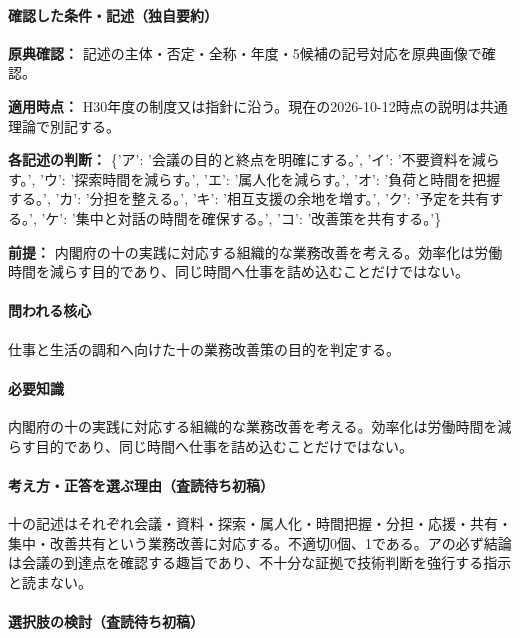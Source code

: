 \paragraph{確認した条件・記述（独自要約）}\mbox{}\par

\noindent\textbf{原典確認：} 記述の主体・否定・全称・年度・5候補の記号対応を原典画像で確認。\par

\noindent\textbf{適用時点：} H30年度の制度又は指針に沿う。現在の2026-10-12時点の説明は共通理論で別記する。\par

\noindent\textbf{各記述の判断：} \{'ア': '会議の目的と終点を明確にする。', 'イ': '不要資料を減らす。', 'ウ': '探索時間を減らす。', 'エ': '属人化を減らす。', 'オ': '負荷と時間を把握する。', 'カ': '分担を整える。', 'キ': '相互支援の余地を増す。', 'ク': '予定を共有する。', 'ケ': '集中と対話の時間を確保する。', 'コ': '改善策を共有する。'\}\par

\noindent\textbf{前提：} 内閣府の十の実践に対応する組織的な業務改善を考える。効率化は労働時間を減らす目的であり、同じ時間へ仕事を詰め込むことだけではない。\par

\paragraph{問われる核心} 仕事と生活の調和へ向けた十の業務改善策の目的を判定する。

\paragraph{必要知識} 内閣府の十の実践に対応する組織的な業務改善を考える。効率化は労働時間を減らす目的であり、同じ時間へ仕事を詰め込むことだけではない。

\paragraph{考え方・正答を選ぶ理由（査読待ち初稿）} 十の記述はそれぞれ会議・資料・探索・属人化・時間把握・分担・応援・共有・集中・改善共有という業務改善に対応する。不適切0個、1である。アの必ず結論は会議の到達点を確認する趣旨であり、不十分な証拠で技術判断を強行する指示と読まない。

\paragraph{選択肢の検討（査読待ち初稿）}\mbox{}\par

